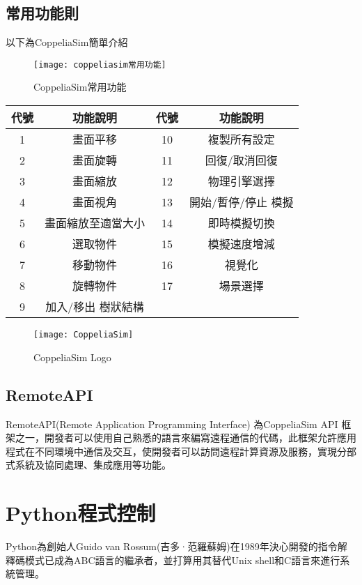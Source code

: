 \subsection{常用功能則}
以下為CoppeliaSim簡單介紹

\begin{figure}[hbt!]
\center
\texttt{[image: coppeliasim常用功能]}
\caption{\Large CoppeliaSim常用功能}
\label{coppeliasim常用功能}
\end{figure}

\begin{table}[htbp]
  \centering
  \large
  \setlength{\tabcolsep}{0.7cm}
  \begin{tabular}{|c|c|c|c|}
    \hline
    代號 & 功能說明 & 代號 & 功能說明 \\
    \hline
    1 & 畫面平移 & 10 & 複製所有設定 \\
    \hline
    2 & 畫面旋轉 & 11 & 回復/取消回復 \\
    \hline
    3 & 畫面縮放 & 12 & 物理引擎選擇 \\
    \hline
    4 & 畫面視角 & 13 & 開始/暫停/停止 模擬 \\
    \hline
    5 & 畫面縮放至適當大小 & 14 & 即時模擬切換 \\
    \hline
    6 & 選取物件 & 15 & 模擬速度增減 \\
    \hline
    7 & 移動物件 & 16 & 視覺化 \\
    \hline
    8 & 旋轉物件 & 17 & 場景選擇 \\
    \hline
    9 & 加入/移出 樹狀結構 & & \\
    \hline
  \end{tabular}
\end{table}
\newpage

\begin{figure}[hbt!]
\center
\texttt{[image: CoppeliaSim]}
\caption{\Large CoppeliaSim Logo}
\end{figure}
\subsection{RemoteAPI}
RemoteAPI(Remote Application Programming Interface) 為CoppeliaSim API 框架之一，開發者可以使用自己熟悉的語言來編寫遠程通信的代碼，此框架允許應用程式在不同環境中通信及交互，使開發者可以訪問遠程計算資源及服務，實現分部式系統及協同處理、集成應用等功能。\\

\section{Python程式控制}
Python為創始人Guido van Rossum(吉多·范羅蘇姆)在1989年決心開發的指令解釋碼模式已成為ABC語言的繼承者，並打算用其替代Unix shell和C語言來進行系統管理。\

